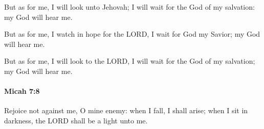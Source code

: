 			\begin{versebox}
					\item[BHS] 
					\item[LXX] 
					\item[ASV] But as for me, I will look unto Jehovah; I will wait for the God of my salvation: my God will hear me.
					\item[NIV] But as for me, I watch in hope for the LORD, I wait for God my Savior; my God will hear me.
					\item[NRSV] But as for me, I will look to the LORD, I will wait for the God of my salvation; my God will hear me.
			\end{versebox}

		\paragraph{Micah 7:8} %
			\label{MICAH-7-8}

			Rejoice not against me, O mine enemy: when I fall, I shall arise; when I sit in darkness, the LORD shall be a light unto me.

